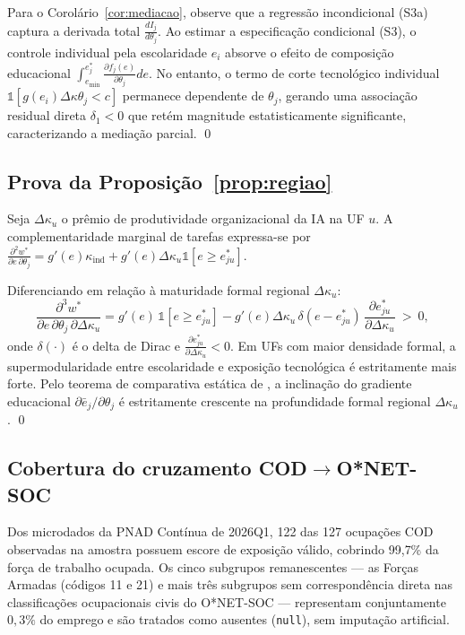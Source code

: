 Para o Corolário~\ref{cor:mediacao}, observe que a regressão incondicional (S3a) captura a derivada total $\frac{d I_j}{d \theta_j}$. Ao estimar a especificação condicional (S3), o controle individual pela escolaridade $e_i$ absorve o efeito de composição educacional $\int_{e_{\min}}^{e^*_j} \frac{\partial f_j(e)}{\partial \theta_j} de$. No entanto, o termo de corte tecnológico individual $\mathbb{1}[g(e_i)\Delta\kappa\theta_j < c]$ permanece dependente de $\theta_j$, gerando uma associação residual direta $\delta_1 < 0$ que retém magnitude estatisticamente significante, caracterizando a mediação parcial. \qed

\subsection{Prova da Proposição~\ref{prop:regiao}}

Seja $\Delta\kappa_u$ o prêmio de produtividade organizacional da IA na UF $u$. A complementaridade marginal de tarefas expressa-se por $\frac{\partial^2 w^*}{\partial e \, \partial \theta_j} = g'(e)\kappa_{\text{ind}} + g'(e)\Delta\kappa_u \mathbb{1}[e \ge e_{ju}^*]$. 

Diferenciando em relação à maturidade formal regional $\Delta\kappa_u$:
\begin{equation}
    \frac{\partial^3 w^*}{\partial e \, \partial \theta_j \, \partial \Delta\kappa_u} = g'(e) \, \mathbb{1}[e \ge e_{ju}^*] - g'(e)\Delta\kappa_u \, \delta(e - e_{ju}^*) \, \frac{\partial e_{ju}^*}{\partial \Delta\kappa_u} \ > \ 0,
\end{equation}
onde $\delta(\cdot)$ é o delta de Dirac e $\frac{\partial e_{ju}^*}{\partial \Delta\kappa_u} < 0$. Em UFs com maior densidade formal, a supermodularidade entre escolaridade e exposição tecnológica é estritamente mais forte. Pelo teorema de comparativa estática de \citet{becker1973theory}, a inclinação do gradiente educacional $\partial \bar{e}_j / \partial \theta_j$ é estritamente crescente na profundidade formal regional $\Delta\kappa_u$. \qed

\subsection{Cobertura do cruzamento \texorpdfstring{COD$\to$O*NET-SOC}{COD para O*NET-SOC}}

Dos microdados da PNAD Contínua de 2026Q1, 122 das 127 ocupações COD observadas na amostra possuem escore de exposição válido, cobrindo 99{,}7\% da força de trabalho ocupada. Os cinco subgrupos remanescentes --- as Forças Armadas (códigos 11 e 21) e mais três subgrupos sem correspondência direta nas classificações ocupacionais civis do O*NET-SOC --- representam conjuntamente $0{,}3\%$ do emprego e são tratados como ausentes (\texttt{null}), sem imputação artificial.


